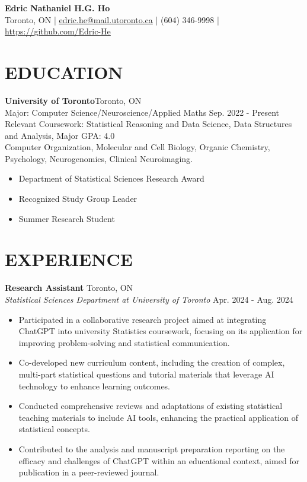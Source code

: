 \documentclass[a4paper,8pt]{extarticle}
\begin{document}
\pagestyle{empty}

\begin{center}
\textbf{\Large Edric Nathaniel H.G. Ho}\\[2pt] %
Toronto, ON | \href{mailto:example@example.com}{edric.he@mail.utoronto.ca} | (604) 346-9998 | \href{https://www.linkedin.com/in/johndoe}{https://github.com/Edric-He}%
\end{center}
\section*{EDUCATION}
\noindent
\textbf{University of Toronto}\hfill Toronto, ON \\ %
Major: Computer Science/Neuroscience/Applied Maths  \hfill Sep. 2022 - Present\\ %
Relevant Coursework: Statistical Reasoning and Data Science, Data Structures and Analysis, \hfill Major GPA: 4.0\\
Computer Organization, Molecular and Cell Biology, Organic Chemistry, Psychology, Neurogenomics, Clinical Neuroimaging. %
\begin{itemize}
    \item Department of Statistical Sciences Research Award
    \item Recognized Study Group Leader
    \item Summer Research Student
\end{itemize}

\section*{EXPERIENCE}
\noindent
\textbf{Research Assistant} \hfill Toronto, ON\\ %
\textit{Statistical Sciences Department at University of Toronto} \hfill Apr. 2024 - Aug. 2024 %
\begin{itemize}
    \item Participated in a collaborative research project aimed at integrating ChatGPT into university Statistics coursework, focusing on its application for improving problem-solving and statistical communication.
    \item Co-developed new curriculum content, including the creation of complex, multi-part statistical questions and tutorial materials that leverage AI technology to enhance learning outcomes.
    \item Conducted comprehensive reviews and adaptations of existing statistical teaching materials to include AI tools, enhancing the practical application of statistical concepts.
    \item Contributed to the analysis and manuscript preparation reporting on the efficacy and challenges of ChatGPT within an educational context, aimed for publication in a peer-reviewed journal.
\end{itemize}
\end{document}
